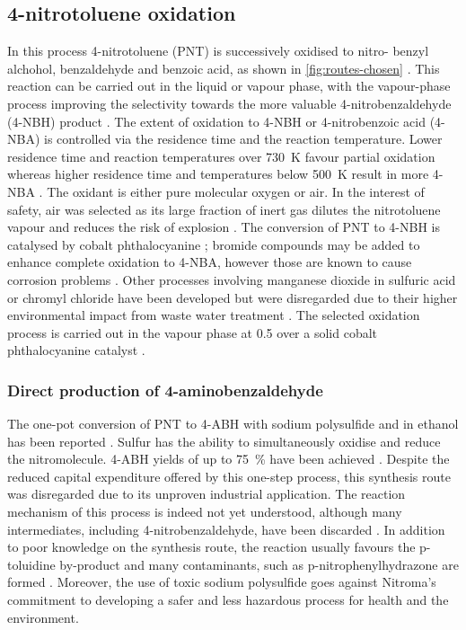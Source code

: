 \subsection{4-nitrotoluene oxidation}

In this process 4-nitrotoluene (PNT) is successively oxidised to nitro- benzyl alchohol, benzaldehyde and benzoic acid, as shown in \cref{fig:routes-chosen} \cite{hoorn_modelling_2005}. This reaction can be carried out in the liquid or vapour phase, with the vapour-phase process improving the selectivity towards the more valuable 4-nitrobenzaldehyde (4-NBH) product \cite{bruhne_benzaldehyde_2011}. 
The extent of oxidation to 4-NBH or 4-nitrobenzoic acid (4-NBA) is controlled via the residence time and the reaction temperature. Lower residence time and reaction temperatures over \SI{730}{\K} favour partial oxidation whereas higher residence time and temperatures below \SI{500}{\K} result in more 4-NBA \cite{bruhne_benzaldehyde_2011,tan_kinetic_2010}.
The oxidant is either pure molecular oxygen or air. In the interest of safety, air was selected as its large fraction of inert  gas dilutes the nitrotoluene vapour and reduces the risk of explosion \cite{bruhne_benzaldehyde_2011}. 
The conversion of PNT to 4-NBH is catalysed by cobalt phthalocyanine \cite{wendt_reaction_1986}; bromide compounds may be added to enhance complete oxidation to 4-NBA, however those are known to cause corrosion problems \cite{opgrande_benzoic_2003}.
Other processes involving manganese dioxide in sulfuric acid or chromyl chloride have been developed but were disregarded due to their higher environmental impact from waste water treatment \cite{bruhne_benzaldehyde_2011}.
The selected oxidation process is carried out in the vapour phase at \SI{0.5}{\atm} over a solid cobalt phthalocyanine catalyst \cite{chandalia_kinetics_1999}. 

\subsubsection{Direct production of 4-aminobenzaldehyde}
The one-pot conversion of PNT to 4-ABH with sodium polysulfide and  in ethanol has been reported \cite{ogata_mechanism_1979}. Sulfur has the ability to simultaneously oxidise and reduce the nitromolecule. 4-ABH yields of up to \SI{75}{\percent} have been achieved \cite{beard_preparation_1944}. Despite the reduced capital expenditure offered by this one-step process, this synthesis route was disregarded due to its unproven industrial application. The reaction mechanism of this process is indeed not yet understood, although many intermediates, including 4-nitrobenzaldehyde, have been discarded \cite{ogata_mechanism_1979}. In addition to poor knowledge on the synthesis route, the reaction usually favours the p-toluidine by-product and many contaminants, such as p-nitrophenylhydrazone are formed \cite{beard_preparation_1944}. Moreover, the use of toxic sodium polysulfide goes against Nitroma's commitment to developing a safer and less hazardous process for health and the environment.

